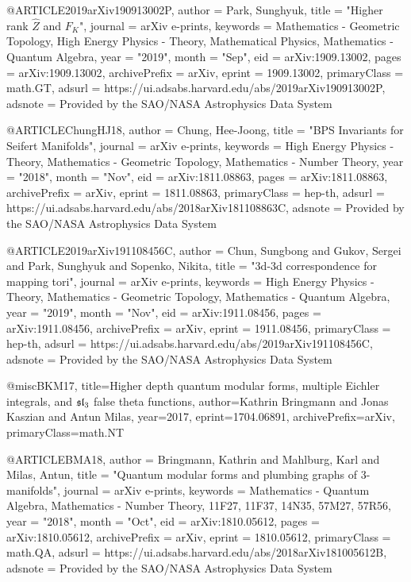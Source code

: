 @ARTICLE{2019arXiv190913002P,
	author = {{Park}, Sunghyuk},
	title = "{Higher rank $\hat{Z}$ and $F_K$}",
	journal = {arXiv e-prints},
	keywords = {Mathematics - Geometric Topology, High Energy Physics - Theory, Mathematical Physics, Mathematics - Quantum Algebra},
	year = "2019",
	month = "Sep",
	eid = {arXiv:1909.13002},
	pages = {arXiv:1909.13002},
	archivePrefix = {arXiv},
	eprint = {1909.13002},
	primaryClass = {math.GT},
	adsurl = {https://ui.adsabs.harvard.edu/abs/2019arXiv190913002P},
	adsnote = {Provided by the SAO/NASA Astrophysics Data System}
}

@ARTICLE{ChungHJ18,
	author = {{Chung}, Hee-Joong},
	title = "{BPS Invariants for Seifert Manifolds}",
	journal = {arXiv e-prints},
	keywords = {High Energy Physics - Theory, Mathematics - Geometric Topology, Mathematics - Number Theory},
	year = "2018",
	month = "Nov",
	eid = {arXiv:1811.08863},
	pages = {arXiv:1811.08863},
	archivePrefix = {arXiv},
	eprint = {1811.08863},
	primaryClass = {hep-th},
	adsurl = {https://ui.adsabs.harvard.edu/abs/2018arXiv181108863C},
	adsnote = {Provided by the SAO/NASA Astrophysics Data System}
}

@ARTICLE{2019arXiv191108456C,
	author = {{Chun}, Sungbong and {Gukov}, Sergei and {Park}, Sunghyuk and
	{Sopenko}, Nikita},
	title = "{3d-3d correspondence for mapping tori}",
	journal = {arXiv e-prints},
	keywords = {High Energy Physics - Theory, Mathematics - Geometric Topology, Mathematics - Quantum Algebra},
	year = "2019",
	month = "Nov",
	eid = {arXiv:1911.08456},
	pages = {arXiv:1911.08456},
	archivePrefix = {arXiv},
	eprint = {1911.08456},
	primaryClass = {hep-th},
	adsurl = {https://ui.adsabs.harvard.edu/abs/2019arXiv191108456C},
	adsnote = {Provided by the SAO/NASA Astrophysics Data System}
}

@misc{BKM17,
	title={Higher depth quantum modular forms, multiple Eichler integrals, and $\frak{sl}_3$ false theta functions},
	author={Kathrin Bringmann and Jonas Kaszian and Antun Milas},
	year={2017},
	eprint={1704.06891},
	archivePrefix={arXiv},
	primaryClass={math.NT}
}

@ARTICLE{BMA18,
	author = {{Bringmann}, Kathrin and {Mahlburg}, Karl and {Milas}, Antun},
	title = "{Quantum modular forms and plumbing graphs of 3-manifolds}",
	journal = {arXiv e-prints},
	keywords = {Mathematics - Quantum Algebra, Mathematics - Number Theory, 11F27, 11F37, 14N35, 57M27, 57R56},
	year = "2018",
	month = "Oct",
	eid = {arXiv:1810.05612},
	pages = {arXiv:1810.05612},
	archivePrefix = {arXiv},
	eprint = {1810.05612},
	primaryClass = {math.QA},
	adsurl = {https://ui.adsabs.harvard.edu/abs/2018arXiv181005612B},
	adsnote = {Provided by the SAO/NASA Astrophysics Data System}
}



